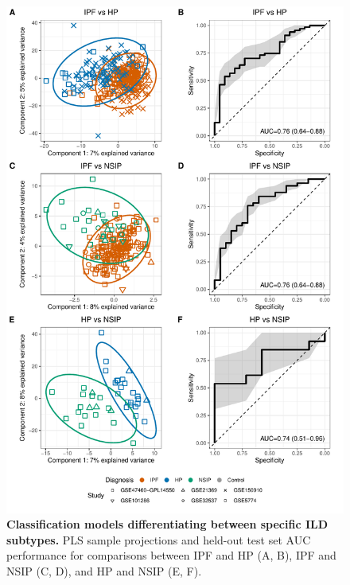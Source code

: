 \documentclass[
]{article}
\begin{document}
\begin{figure}

{\centering \includegraphics[width=0.8\linewidth,]{./Figures/SysReview/FigE6_ILDvsILD} 

}

\caption[Individual ILD vs ILD]{\textbf{Classification models differentiating between specific ILD subtypes.} PLS sample projections and held-out test set AUC performance for comparisons between IPF and HP (A, B), IPF and NSIP (C, D), and HP and NSIP (E, F).}\label{fig:ildvsildspecific}
\end{figure}

\newpage
\end{document}
